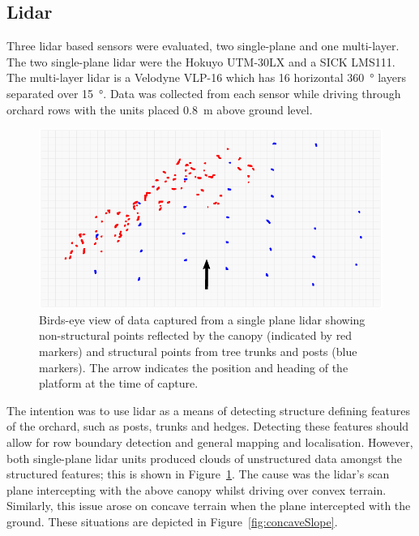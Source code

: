 \documentclass[preprint,authoryear,12pt]{elsarticle}
\begin{document}
    \subsection{Lidar}
        Three lidar based sensors were evaluated, two single-plane and one multi-layer.
        The two single-plane lidar were the Hokuyo UTM-30LX and a SICK LMS111.
        The multi-layer lidar is a Velodyne VLP-16 which has 16 horizontal \SI{360}{\degree} layers separated over \SI{15}{\degree}.
        Data was collected from each sensor while driving through orchard rows with the units placed \SI{0.8}{\meter} above ground level.

        \begin{figure}[htb]
            \centering
            \includegraphics[width=\linewidth]{images/canopy_data.pdf}
            \caption{
                Birds-eye view of data captured from a single plane lidar showing non-structural points reflected by the canopy (indicated by red markers) and structural points from tree trunks and posts (blue markers).
                The arrow indicates the position and heading of the platform at the time of capture.
            }
            \label{fig:canopyDataCloud}
        \end{figure}

        The intention was to use lidar as a means of detecting structure defining features of the orchard, such as posts, trunks and hedges.
        Detecting these features should allow for row boundary detection and general mapping and localisation.
        However, both single-plane lidar units produced clouds of unstructured data amongst the structured features; this is shown in Figure~\ref{fig:canopyDataCloud}.
        The cause was the lidar's scan plane intercepting with the above canopy whilst driving over convex terrain.
        Similarly, this issue arose on concave terrain when the plane intercepted with the ground.
        These situations are depicted in Figure~\ref{fig:concaveSlope}.
\end{document}
